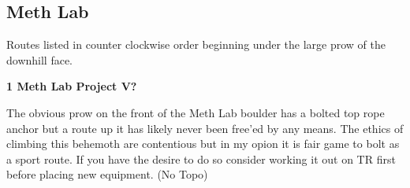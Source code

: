 \begin{multicols*}{2}
			\subsection*{Meth Lab}\label{bf:Meth Lab}
			\begin{minipage}{\columnwidth}
			Routes listed in counter clockwise order beginning under the large prow of the downhill face.
			\end{minipage}
			
\label{pt:Octurnal}
					\label{rt:Meth Lab Project}\colorbox{black!20}{\textbf{1 Meth Lab Project V?  \warn \warn \warn }}
					\begin{adjustwidth}{0.5cm}{}
					\begin{minipage}{\linewidth}					
					The obvious prow on the front of the Meth Lab boulder has a bolted top rope anchor but a route up it has likely never been free'ed by any means. The ethics of climbing this behemoth are contentious but in my opion it is fair game to bolt as a sport route. If you have the desire to do so consider working it out on TR first before placing new equipment.
						\newline (No Topo) 
					\end{minipage}
					\end{adjustwidth}


\end{multicols*}
